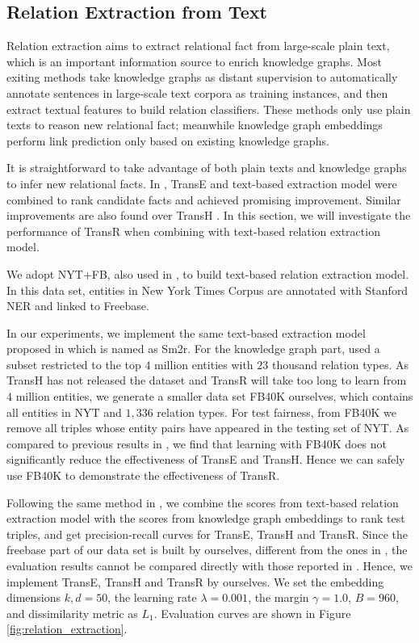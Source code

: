     \subsection{Relation Extraction from Text}
    Relation extraction aims to extract relational fact from large-scale plain text, which is an important information source to enrich knowledge graphs. Most exiting methods  take knowledge graphs as distant supervision to automatically annotate sentences in large-scale text corpora as training instances, and then extract textual features to build relation classifiers. These methods only use plain texts to reason new relational fact; meanwhile knowledge graph embeddings perform link prediction only based on existing knowledge graphs.

    It is straightforward to take advantage of both plain texts and knowledge graphs to infer new relational facts. In , TransE and text-based extraction model were combined to rank candidate facts and achieved promising improvement. Similar improvements are also found over TransH . In this section, we will investigate the performance of TransR when combining with text-based relation extraction model.

    We adopt NYT+FB, also used in , to build text-based relation extraction model. In this data set, entities in New York Times Corpus are annotated with Stanford NER and linked to Freebase.

    In our experiments, we implement the same text-based extraction model proposed in  which is named as Sm2r. For the knowledge graph part,  used a subset restricted to the top $4$ million entities with $23$ thousand relation types. As TransH has not released the dataset and TransR will take too long to learn from $4$ million entities, we generate a smaller data set FB40K ourselves, which contains all entities in NYT and $1,336$ relation types. For test fairness, from FB40K we remove all triples whose entity pairs have appeared in the testing set of NYT. As compared to previous results in , we find that learning with FB40K does not significantly reduce the effectiveness of TransE and TransH. Hence we can safely use FB40K to demonstrate the effectiveness of TransR.

    Following the same method in , we combine the scores from text-based relation extraction model with the scores from knowledge graph embeddings to rank test triples, and get precision-recall curves for TransE, TransH and TransR. Since the freebase part of our data set is built by ourselves, different from the ones in , the evaluation results cannot be compared directly with those reported in . Hence, we implement TransE, TransH and TransR by ourselves. We set the embedding dimensions $k, d = 50$, the learning rate $\lambda = 0.001$, the margin $\gamma = 1.0$, $B = 960$, and dissimilarity metric as $L_1$. Evaluation curves are shown in Figure \ref{fig:relation_extraction}.

